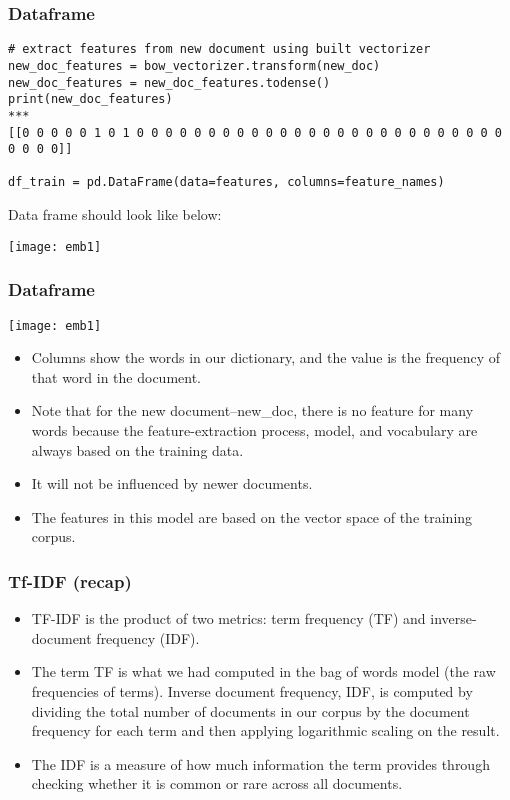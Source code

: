 \begin{frame}[fragile]\frametitle{Dataframe}
\begin{lstlisting}
# extract features from new document using built vectorizer
new_doc_features = bow_vectorizer.transform(new_doc)
new_doc_features = new_doc_features.todense()
print(new_doc_features)
***
[[0 0 0 0 0 1 0 1 0 0 0 0 0 0 0 0 0 0 0 0 0 0 0 0 0 0 0 0 0 0 0 0 0 0 0 0 0 0]]

df_train = pd.DataFrame(data=features, columns=feature_names)
\end{lstlisting}
Data frame should look like below:

\begin{center}
\texttt{[image: emb1]}
\end{center}
\end{frame}

\begin{frame}[fragile]\frametitle{Dataframe}
\begin{center}
\texttt{[image: emb1]}
\end{center}

\begin{itemize}
\item Columns show the words in our dictionary, and the value is the frequency of that word in the document. 
\item Note that for the new document–new\_doc, there is no feature for many words because the feature-extraction process, model, and vocabulary are always based on the training data. 
\item It will not be influenced by newer documents. 
\item The features in this model are based on the vector space of the training corpus.
\end{itemize}
\end{frame}


\begin{frame}[fragile]\frametitle{Tf-IDF (recap)}
\begin{itemize}
\item TF-IDF is the product of two metrics: term frequency (TF) and inverse-document frequency (IDF). \item The term TF is what we had computed in the bag of words model (the raw frequencies of terms). Inverse document frequency, IDF, is computed by dividing the total number of documents in our corpus by the document frequency for each term and then applying logarithmic scaling on the result. 
\item  The IDF is a measure of how much information the term provides through checking whether it is common or rare across all documents.
\end{itemize}
\end{frame}


